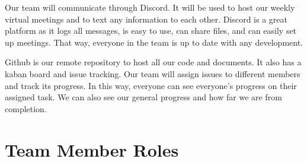 \documentclass{article}
\begin{document}
Our team will communicate through Discord. It will be used to host our weekly virtual meetings
and to text any information to each other. Discord is a great platform as it logs all messages, is
easy to use, can share files, and can easily set up meetings. That way, everyone in the team is 
up to date with any development.

Github is our remote repository to host all our code and documents. It also has a kaban board and
issue tracking. Our team will assign issues to different members and track its progress. In this 
way, everyone can see everyone's progress on their assigned task. We can also see our general
progress and how far we are from completion.

\section{Team Member Roles}
\end{document}
